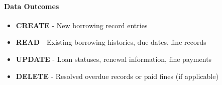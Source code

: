 \paragraph{Data Outcomes}
\begin{itemize}
    \item \textbf{CREATE} - New borrowing record entries
    \item \textbf{READ} - Existing borrowing histories, due dates, fine records
    \item \textbf{UPDATE} - Loan statuses, renewal information, fine payments
    \item \textbf{DELETE} - Resolved overdue records or paid fines (if applicable)
\end{itemize}